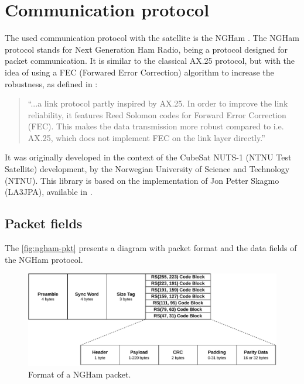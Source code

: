 \section{Communication protocol}

The used communication protocol with the satellite is the NGHam \cite{pyngham-doc}. The NGHam protocol stands for Next Generation Ham Radio, being a protocol designed for packet communication. It is similar to the classical AX.25 \cite{ax25} protocol, but with the idea of using a FEC (Forwared Error Correction) algorithm to increase the robustness, as defined in \cite{lofaldli2016}:

\begin{quote}
``...a link protocol partly inspired by AX.25. In order to improve the link reliability, it features Reed Solomon codes for Forward Error Correction (FEC). This makes the data transmission more robust compared to i.e. AX.25, which does not implement FEC on the link layer directly.''
\end{quote}

It was originally developed in the context of the CubeSat NUTS-1 (NTNU Test Satellite) development, by the Norwegian University of Science and Technology (NTNU). This library is based on the implementation of Jon Petter Skagmo (LA3JPA), available in \cite{ngham}.

\subsection{Packet fields}

The \autoref{fig:ngham-pkt} presents a diagram with packet format and the data fields of the NGHam protocol.

\begin{figure}[!ht]
    \begin{center}
        \includegraphics[width=\textwidth]{figures/ngham-pkt.pdf}
        \caption{Format of a NGHam packet.}
        \label{fig:ngham-pkt}
    \end{center}
\end{figure}

